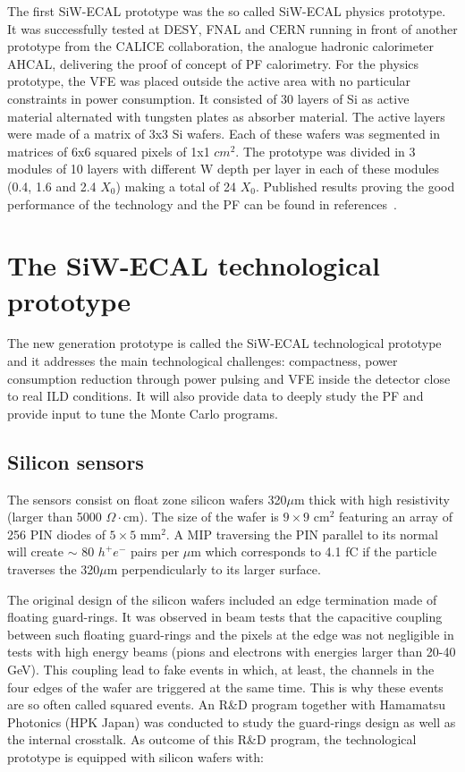 \documentclass[a4paper,11pt]{article}
\begin{document}
The first SiW-ECAL prototype was the so called SiW-ECAL physics prototype.
It was successfully tested at DESY, FNAL and CERN running in front of another prototype from the CALICE
collaboration, the analogue hadronic calorimeter AHCAL, delivering the proof of concept of PF calorimetry.
For the physics prototype, the VFE was placed outside the active area with no particular constraints in power consumption.
It consisted of 30 layers of Si as active material alternated with tungsten plates as absorber material.
The active layers were made of a matrix of 3x3 Si wafers. Each of these wafers was segmented in matrices of
6x6 squared pixels of 1x1 $cm^{2}$.
The prototype was divided in 3 modules of 10 layers with different W depth per layer in each of these modules
(0.4, 1.6 and 2.4 $X_{0}$) making a total of 24 $X_{0}$.
Published results proving the good performance of the technology and the PF can be found in references~\cite{Adloff:2011ha,Anduze:2008hq,Adloff:2008aa,Adloff:2010xj,CALICE:2011aa,Bilki:2014uep}.

\section{The SiW-ECAL technological prototype}


The new generation prototype is called the SiW-ECAL technological prototype and it addresses the main technological challenges: compactness,
power consumption reduction through power pulsing and VFE inside the detector close to real ILD conditions.
It will also provide data to deeply study the PF and provide input to tune the Monte Carlo programs.

\subsection{Silicon sensors}
\label{sec:wafers}

The sensors consist on float zone silicon wafers 320$\mu$m thick with high resistivity (larger than 5000 $\Omega\cdot$cm). The size of the wafer is $9\times9$ cm$^{2}$ featuring an array of 256 PIN diodes of $5\times5$ mm$^{2}$. A MIP traversing the PIN parallel to its normal will create $\sim$ 80 $h^{+}e^{-}$ pairs per $\mu$m which corresponds to 4.1 fC if the particle traverses the 320$\mu$m perpendicularly to its larger surface.

The original design of the silicon wafers included an edge termination made of floating guard-rings.
It was observed in beam tests \cite{Cornat:2015eoa,Cornat:2009zz} that the capacitive coupling between such floating guard-rings 
and the pixels at the edge was not negligible in tests with high energy beams (pions and electrons with energies larger than 20-40 GeV).
This coupling lead to fake events in which, at least,
the channels in the four edges of the wafer are triggered at the same time. 
This is why these events are so often called squared events. 
An R\&D program together with Hamamatsu Photonics (HPK Japan) was conducted to study the guard-rings design 
as well as the internal crosstalk. As outcome of this R\&D program, the technological prototype 
is equipped with silicon wafers with:
\end{document}
